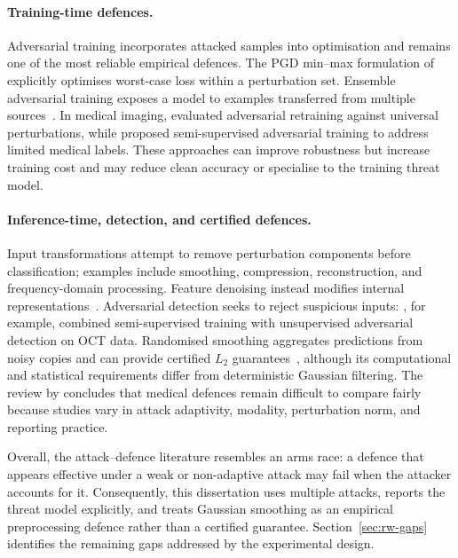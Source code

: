 \documentclass[12pt,a4paper,oneside]{report}
\begin{document}
\paragraph{Training-time defences.}
Adversarial training incorporates attacked samples into optimisation and remains one of the most reliable empirical defences. The PGD min--max formulation of \citet{madry2018towards} explicitly optimises worst-case loss within a perturbation set. Ensemble adversarial training exposes a model to examples transferred from multiple sources~\cite{tramer2018ensemble}. In medical imaging, \citet{hirano2021universal} evaluated adversarial retraining against universal perturbations, while \citet{li2020defending} proposed semi-supervised adversarial training to address limited medical labels. These approaches can improve robustness but increase training cost and may reduce clean accuracy or specialise to the training threat model.

\paragraph{Inference-time, detection, and certified defences.}
Input transformations attempt to remove perturbation components before classification; examples include smoothing, compression, reconstruction, and frequency-domain processing. Feature denoising instead modifies internal representations~\cite{xie2019feature}. Adversarial detection seeks to reject suspicious inputs: \citet{li2020defending}, for example, combined semi-supervised training with unsupervised adversarial detection on OCT data. Randomised smoothing aggregates predictions from noisy copies and can provide certified $L_2$ guarantees~\cite{cohen2019certified}, although its computational and statistical requirements differ from deterministic Gaussian filtering. The review by \citet{dong2023survey} concludes that medical defences remain difficult to compare fairly because studies vary in attack adaptivity, modality, perturbation norm, and reporting practice.

Overall, the attack--defence literature resembles an arms race: a defence that appears effective under a weak or non-adaptive attack may fail when the attacker accounts for it. Consequently, this dissertation uses multiple attacks, reports the threat model explicitly, and treats Gaussian smoothing as an empirical preprocessing defence rather than a certified guarantee. Section~\ref{sec:rw-gaps} identifies the remaining gaps addressed by the experimental design.
\end{document}
